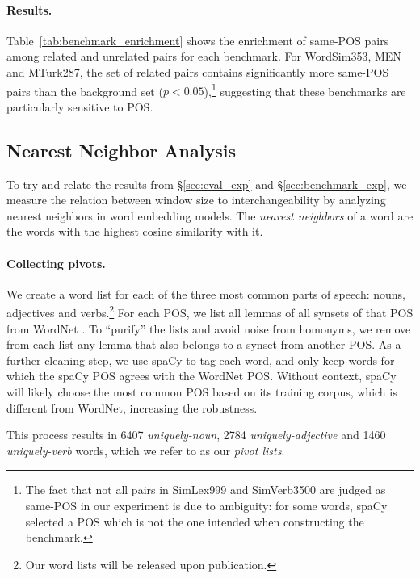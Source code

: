\documentclass[11pt,a4paper]{article}
\begin{document}
    \paragraph{Results.}
    
    Table~\ref{tab:benchmark_enrichment} shows the enrichment of same-POS pairs
    among related and unrelated pairs for each benchmark.
    For WordSim353, MEN and MTurk287, the set of related pairs
    contains significantly more same-POS pairs than the background
    set ($p<0.05$),\footnote{The fact that not all pairs in SimLex999 and SimVerb3500
    are judged as same-POS
    in our experiment is due to ambiguity: for some words, spaCy selected a POS
    which is not the one intended when constructing the benchmark.}
    suggesting that these benchmarks are particularly sensitive to POS.
    
    
    \subsection{Nearest Neighbor Analysis}\label{sec:interchangeability_exp}
    
    To try and relate the results from \S\ref{sec:eval_exp} and \S\ref{sec:benchmark_exp},
    we measure the relation between window size to interchangeability
    by analyzing nearest neighbors in word embedding models.
    The \textit{nearest neighbors} of a word are the words with the highest cosine similarity with it.
        
    \paragraph{Collecting pivots.}
    
    We create a word list for each of the three most
    common parts of speech:
    nouns, adjectives and verbs.\footnote{Our word lists will be released upon publication.}
    For each POS, we list all lemmas of all synsets of that POS from
    WordNet \cite{miller1998wordnet}.
    To ``purify'' the lists and avoid noise from homonyms,
    we remove from each list any lemma that also belongs to a synset from
    another POS.
    As a further cleaning step, we use spaCy to tag each word,
    and only keep words for which the spaCy POS agrees with the WordNet POS.
    Without context, spaCy will likely choose the most
    common POS based on its training corpus, which is different from WordNet,
    increasing the robustness.
    
    This process results in 6407 \textit{uniquely-noun}, 2784 \textit{uniquely-adjective}
    and 1460 \textit{uniquely-verb} words, which we refer to as our \textit{pivot lists}.
    
\end{document}
